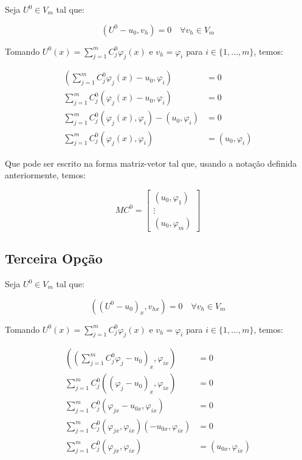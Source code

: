   Seja $U^0 \in V_m$ tal que:

  \[(U^0 - u_0, v_h) = 0 \quad \forall v_h \in V_m\]

  Tomando $U^0(x) = \displaystyle\sum_{j=1}^{m} C^0_j \varphi_j(x)$ e $v_h = \varphi_i$ para $i \in \{1,\dots,m\}$, temos:

  \begin{align*}
    (\sum_{j=1}^{m} C^0_j \varphi_j(x) - u_0, \varphi_i) &= 0 \\
    \sum_{j=1}^{m} C^0_j (\varphi_j(x) - u_0, \varphi_i) &= 0 \\
    \sum_{j=1}^{m} C^0_j (\varphi_j(x), \varphi_i) - (u_0, \varphi_i) &= 0 \\
    \sum_{j=1}^{m} C^0_j (\varphi_j(x), \varphi_i) &= (u_0, \varphi_i)
  \end{align*}

  Que pode ser escrito na forma matriz-vetor tal que, usando a notação definida anteriormente, temos:

  \[MC^0 = \begin{bmatrix} (u_0, \varphi_1) \\ \vdots \\ (u_0, \varphi_m) \end{bmatrix}\]

\subsection{Terceira Opção}

  Seja $U^0 \in V_m$ tal que:

  \[((U^0 - u_0)_x, v_{hx}) = 0 \quad \forall v_h \in V_m\]

  Tomando $U^0(x) = \displaystyle\sum_{j=1}^{m} C^0_j \varphi_j(x)$ e $v_h = \varphi_i$ para $i \in \{1,\dots,m\}$, temos:

  \begin{align*}
    ((\sum_{j=1}^{m} C^0_j \varphi_j - u_0)_x, \varphi_{ix}) &= 0 \\
    \sum_{j=1}^{m} C^0_j ((\varphi_j - u_0)_x, \varphi_{ix}) &= 0 \\
    \sum_{j=1}^{m} C^0_j (\varphi_{jx} - u_{0x}, \varphi_{ix}) &= 0 \\
    \sum_{j=1}^{m} C^0_j (\varphi_{jx}, \varphi_{ix}) (- u_{0x}, \varphi_{ix}) &= 0 \\
    \sum_{j=1}^{m} C^0_j (\varphi_{jx}, \varphi_{ix}) &= (u_{0x}, \varphi_{ix}) \\
  \end{align*}

